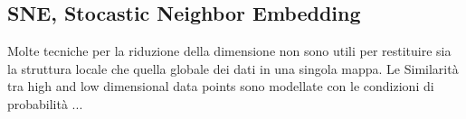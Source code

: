 \subsection{SNE, Stocastic Neighbor Embedding}
Molte tecniche per la riduzione della dimensione non sono utili per restituire sia la struttura locale che quella globale dei dati in una singola mappa.
Le Similarità tra  high and low dimensional data points sono modellate con le condizioni di probabilità
...
